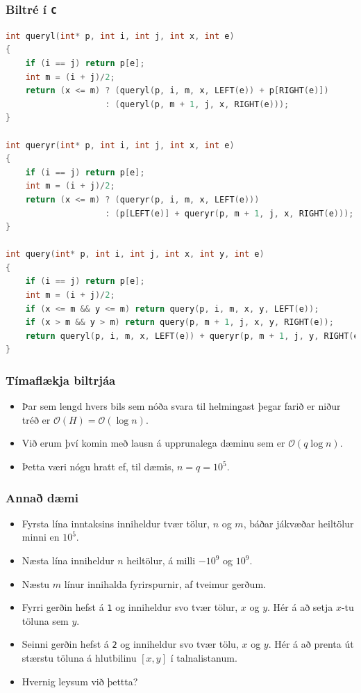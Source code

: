 \documentclass{beamer}
\begin{document}
\begin{frame}[fragile]
	\frametitle{Biltré í \texttt{C}}
	\tiny
	\begin{lstlisting}[language=C]
int queryl(int* p, int i, int j, int x, int e)
{
	if (i == j) return p[e];
	int m = (i + j)/2;
	return (x <= m) ? (queryl(p, i, m, x, LEFT(e)) + p[RIGHT(e)])
                    : (queryl(p, m + 1, j, x, RIGHT(e)));
}

int queryr(int* p, int i, int j, int x, int e)
{
	if (i == j) return p[e];
	int m = (i + j)/2;
	return (x <= m) ? (queryr(p, i, m, x, LEFT(e)))
                    : (p[LEFT(e)] + queryr(p, m + 1, j, x, RIGHT(e)));
}

int query(int* p, int i, int j, int x, int y, int e)
{
	if (i == j) return p[e];
	int m = (i + j)/2;
	if (x <= m && y <= m) return query(p, i, m, x, y, LEFT(e));
	if (x > m && y > m) return query(p, m + 1, j, x, y, RIGHT(e));
	return queryl(p, i, m, x, LEFT(e)) + queryr(p, m + 1, j, y, RIGHT(e));
}
\end{lstlisting}
\end{frame}

\begin{frame}
\frametitle{Tímaflækja biltrjáa}
\begin{itemize}
\item<1-> Þar sem lengd hvers bils sem nóða svara til helmingast þegar farið er niður tréð er $\mathcal{O}(H) = \mathcal{O}(\log n)$.
\item<2-> Við erum því komin með lausn á upprunalega dæminu sem er $\mathcal{O}(q \log n)$.
\item<3-> Þetta væri nógu hratt ef, til dæmis, $n = q = 10^5$.
\end{itemize}
\end{frame}

\begin{frame}
\frametitle{Annað dæmi}
\begin{itemize}
\item<1-> Fyrsta lína inntaksins inniheldur tvær tölur, $n$ og $m$, báðar jákvæðar heiltölur minni en $10^5$.
\item<2-> Næsta lína inniheldur $n$ heiltölur, á milli $-10^9$ og $10^9$.
\item<3-> Næstu $m$ línur innihalda fyrirspurnir, af tveimur gerðum. 
\item<4-> Fyrri gerðin hefst á \texttt{1} og inniheldur svo tvær tölur, $x$ og $y$. Hér á að setja $x$-tu töluna sem $y$.
\item<5-> Seinni gerðin hefst á \texttt{2} og inniheldur svo tvær tölu,
$x$ og $y$. Hér á að prenta út stærstu töluna á hlutbilinu $[x, y]$ í talnalistanum.
\item<6-> Hvernig leysum við þettta?
\end{itemize}
\end{frame}
\end{document}
